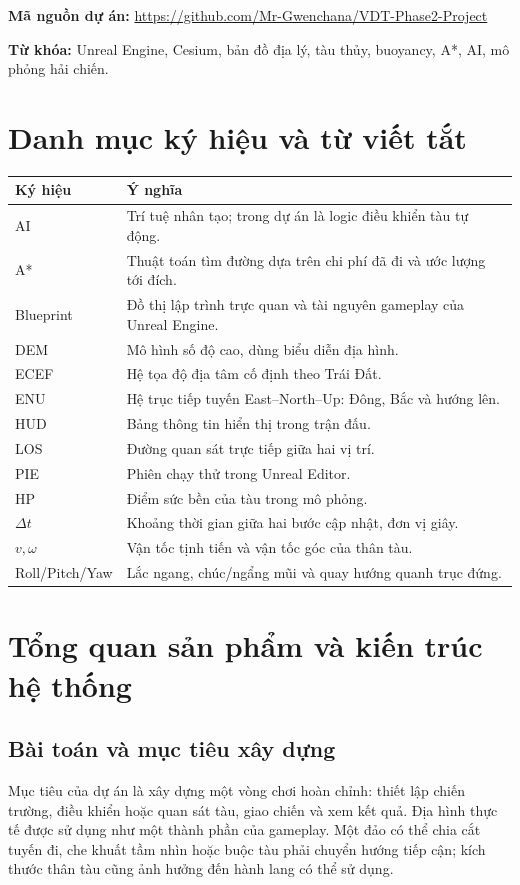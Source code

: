 \documentclass[11pt,a4paper,oneside]{report}
\begin{document}
\noindent\textbf{Mã nguồn dự án:} \url{https://github.com/Mr-Gwenchana/VDT-Phase2-Project}
\par\smallskip
\noindent\textbf{Từ khóa:} Unreal Engine, Cesium, bản đồ địa lý, tàu thủy, buoyancy, A*, AI, mô phỏng hải chiến.
\begingroup\small{}\tableofcontents\endgroup
\listoffigures
\listoftables
\chapter*{Danh mục ký hiệu và từ viết tắt}
\begin{tabularx}{\linewidth}{@{}lX@{}}\toprule
\textbf{Ký hiệu}&\textbf{Ý nghĩa}\\\midrule
AI&Trí tuệ nhân tạo; trong dự án là logic điều khiển tàu tự động.\\
A*&Thuật toán tìm đường dựa trên chi phí đã đi và ước lượng tới đích.\\
Blueprint&Đồ thị lập trình trực quan và tài nguyên gameplay của Unreal Engine.\\
DEM&Mô hình số độ cao, dùng biểu diễn địa hình.\\
ECEF&Hệ tọa độ địa tâm cố định theo Trái Đất.\\
ENU&Hệ trục tiếp tuyến East--North--Up: Đông, Bắc và hướng lên.\\
HUD&Bảng thông tin hiển thị trong trận đấu.\\
LOS&Đường quan sát trực tiếp giữa hai vị trí.\\
PIE&Phiên chạy thử trong Unreal Editor.\\
HP&Điểm sức bền của tàu trong mô phỏng.\\
$\Delta t$&Khoảng thời gian giữa hai bước cập nhật, đơn vị giây.\\
$v,\omega$&Vận tốc tịnh tiến và vận tốc góc của thân tàu.\\
Roll/Pitch/Yaw&Lắc ngang, chúc/ngẩng mũi và quay hướng quanh trục đứng.\\\bottomrule
\end{tabularx}
\clearpage{}

\chapter{Tổng quan sản phẩm và kiến trúc hệ thống}
\section{Bài toán và mục tiêu xây dựng}
Mục tiêu của dự án là xây dựng một vòng chơi hoàn chỉnh: thiết lập chiến trường, điều khiển hoặc quan sát tàu, giao chiến và xem kết quả. Địa hình thực tế được sử dụng như một thành phần của gameplay. Một đảo có thể chia cắt tuyến đi, che khuất tầm nhìn hoặc buộc tàu phải chuyển hướng tiếp cận; kích thước thân tàu cũng ảnh hưởng đến hành lang có thể sử dụng.
\end{document}
